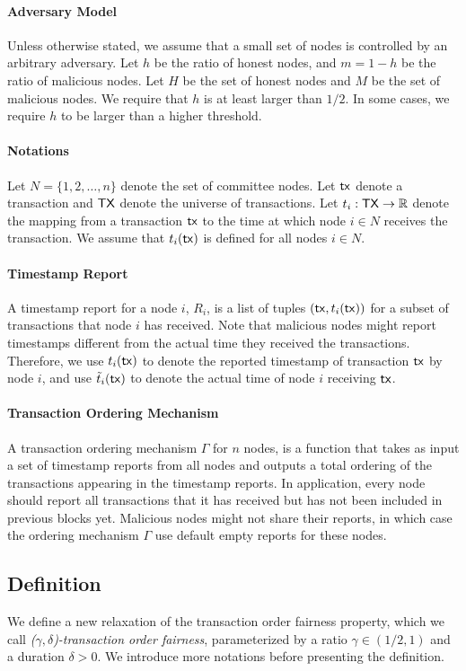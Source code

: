 \documentclass[runningheads]{llncs}
\begin{document}
\paragraph{Adversary Model} Unless otherwise stated, we assume that a small set of nodes is controlled by an arbitrary adversary. Let $h$ be the ratio of honest nodes, and $m=1-h$ be the ratio of malicious nodes. Let $H$ be the set of honest nodes and $M$ be the set of malicious nodes. We require that $h$ is at least larger than $1/2$. In some cases, we require $h$ to be larger than a higher threshold. 

\paragraph{Notations} Let $N = \{1, 2, \dots, n\}$ denote the set of committee nodes. Let $\mathsf{tx}$ denote a transaction and $\mathsf{TX}$ denote the universe of transactions. Let $t_i:\mathsf{TX}\to \mathbb{R}$ denote the mapping from a transaction $\mathsf{tx}$ to the time at which node $i\in N$ receives the transaction. We assume that $t_i(\mathsf{tx})$ is defined for all nodes $i\in N$.

\paragraph{Timestamp Report} A timestamp report for a node $i$, $R_i$, is a list of tuples $(\mathsf{tx}, t_i(\mathsf{tx}))$ for a subset of transactions that node $i$ has received. Note that malicious nodes might report timestamps different from the actual time they received the transactions. Therefore, we use $t_i(\mathsf{tx})$ to denote the reported timestamp of transaction $\mathsf{tx}$ by node $i$, and use $\tilde{t}_i(\mathsf{tx})$ to denote the actual time of node $i$ receiving $\mathsf{tx}$. 

\paragraph{Transaction Ordering Mechanism} A transaction ordering mechanism $\Gamma$ for $n$ nodes, is a function that takes as input a set of timestamp reports from all nodes and outputs a total ordering of the transactions appearing in the timestamp reports. In application, every node should report all transactions that it has received but has not been included in previous blocks yet. Malicious nodes might not share their reports, in which case the ordering mechanism $\Gamma$ use default empty reports for these nodes. 




\subsection{Definition}
We define a new relaxation of the transaction order fairness property, which we call \emph{($\gamma,\delta$)-transaction order fairness}, parameterized by a ratio $\gamma\in (1/2,1)$ and a duration $\delta>0$. We introduce more notations before presenting the definition. 
\end{document}
